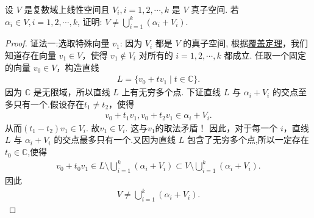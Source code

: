 \documentclass[../../main.tex]{subfiles}%
\begin{document}
\begin{example}
设 \(V\) 是复数域上线性空间且 \(V_i, i=1,2,\cdots,k\) 是 \(V\) 真子空间. 若 \(\alpha_i \in V, i=1,2,\cdots,k\), 证明: \(V \neq \bigcup\limits_{i=1}^k (\alpha_i + V_i).\)
\end{example}
\begin{proof}

{\color{blue}证法一:}选取特殊向量 \(v_1\): 因为 \(V_i\) 都是 \(V\) 的真子空间, 根据\hyperref[theorem:覆盖定理]{覆盖定理}，我们知道存在向量 \(v_1 \in V\)，使得 \(v_1 \notin V_i\) 对所有的 \(i=1,2,\cdots,k\) 都成立.
任取一个固定的向量 \(v_0 \in V\)，构造直线
\begin{align*}
L = \{ v_0 + t v_1 \mid t \in \mathbb{C} \}.
\end{align*}
因为 \(\mathbb{C}\) 是无限域，所以直线 \(L\) 上有无穷多个点.
下证直线 \(L\) 与 \(\alpha_i + V_i\) 的交点至多只有一个.假设存在\(t_1 \neq t_2\)，使得
\begin{align*}
v_0 + t_1 v_1,v_0 + t_2 v_1 \in \alpha_i + V_i.
\end{align*}
从而$(t_1 - t_2)v_1 \in V_i.$
故\(v_1 \in V_i\). 这与\(v_1\)的取法矛盾！
因此，对于每一个 \(i\)，直线 \(L\) 与 \(\alpha_i + V_i\) 的交点最多只有一个.又因为直线 \(L\) 包含了无穷多个点,所以一定存在$t_0\in \mathbb{C}$,使得
\begin{align*}
v_0 + t_0 v_1 \in L\setminus \bigcup\limits_{i=1}^k (\alpha_i + V_i)\subset V\setminus \bigcup\limits_{i=1}^k (\alpha_i + V_i). 
\end{align*}
因此
\begin{align*}
V \neq \bigcup\limits_{i=1}^k (\alpha_i + V_i).
\end{align*}


\end{proof}
\end{document}
